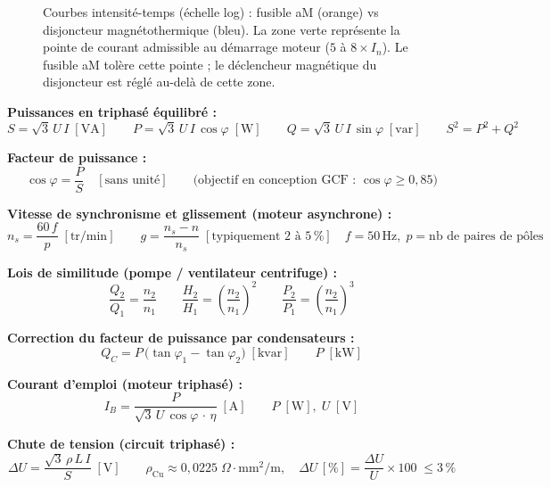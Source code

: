 \begin{figure}[htbp]
  \caption{Courbes intensité-temps (échelle log) : fusible aM (orange) vs disjoncteur magnétothermique (bleu). La zone verte représente la pointe de courant admissible au démarrage moteur ($5$ à $8 \times I_n$). Le fusible aM tolère cette pointe ; le déclencheur magnétique du disjoncteur est réglé au-delà de cette zone.}
  \label{fig:courbes-protection}
\end{figure}

\begin{tcolorbox}[
  enhanced, colback=FedBlue!3, colframe=FedBlue!50,
  fonttitle=\bfseries\sffamily, coltitle=FedBlue,
  title={FICHE MÉMO — Électrotechnique appliquée CVC}, boxrule=0.8pt, arc=2pt,
  width=\textwidth
]
\textbf{Puissances en triphasé équilibré :}
\[
  S = \sqrt{3}\,U\,I \;[\text{VA}] \qquad
  P = \sqrt{3}\,U\,I\,\cos\varphi \;[\text{W}] \qquad
  Q = \sqrt{3}\,U\,I\,\sin\varphi \;[\text{var}] \qquad
  S^2 = P^2 + Q^2
\]

\textbf{Facteur de puissance :}
\[
  \cos\varphi = \frac{P}{S} \quad [\text{sans unité}]
  \qquad \text{(objectif en conception GCF : } \cos\varphi \geq 0{,}85\text{)}
\]

\textbf{Vitesse de synchronisme et glissement (moteur asynchrone) :}
\[
  n_s = \frac{60\,f}{p} \;[\text{tr/min}]
  \qquad
  g = \frac{n_s - n}{n_s} \;[\text{typiquement } 2\text{ à }5\,\%]
  \quad f = 50\,\text{Hz},\; p = \text{nb de paires de pôles}
\]

\textbf{Lois de similitude (pompe / ventilateur centrifuge) :}
\[
  \frac{Q_2}{Q_1} = \frac{n_2}{n_1}
  \qquad
  \frac{H_2}{H_1} = \left(\frac{n_2}{n_1}\right)^{\!2}
  \qquad
  \frac{P_2}{P_1} = \left(\frac{n_2}{n_1}\right)^{\!3}
\]

\textbf{Correction du facteur de puissance par condensateurs :}
\[
  Q_C = P\,\bigl(\tan\varphi_1 - \tan\varphi_2\bigr) \;[\text{kvar}]
  \qquad P \;[\text{kW}]
\]

\textbf{Courant d'emploi (moteur triphasé) :}
\[
  I_B = \frac{P}{\sqrt{3}\,U\,\cos\varphi\,\cdot\,\eta} \;[\text{A}]
  \qquad P \;[\text{W}],\; U \;[\text{V}]
\]

\textbf{Chute de tension (circuit triphasé) :}
\[
  \Delta U = \frac{\sqrt{3}\,\rho\,L\,I}{S} \;[\text{V}]
  \qquad \rho_{\text{Cu}} \approx 0{,}0225\;\Omega\cdot\text{mm}^2/\text{m}, \quad
  \Delta U\,[\%] = \frac{\Delta U}{U} \times 100 \;\leq 3\,\%
\]
\end{tcolorbox}

\finchapitre
